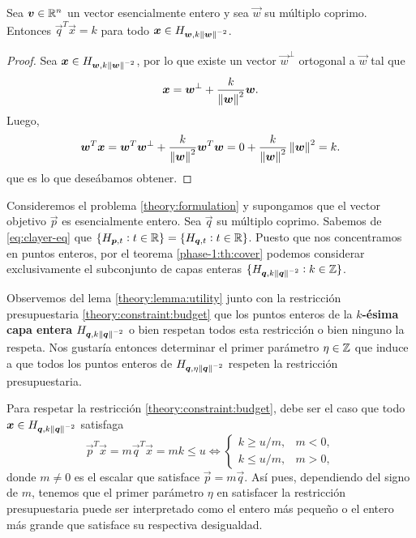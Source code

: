 \begin{lemma}
	\label{theory:lemma:utility}
	Sea $\boldsymbol{v} \in \mathbb{R}^n$ un vector esencialmente entero y sea $\vec{w}$ su múltiplo coprimo.
	Entonces $\vec{q}^T\vec{x} = k$ para todo $\boldsymbol{x} \in H_{\boldsymbol{w}, k\left\lVert \boldsymbol{w} \right\rVert^{-2}}$.
\end{lemma}
\begin{proof}
	Sea $\boldsymbol{x} \in H_{\boldsymbol{w}, k\left\lVert \boldsymbol{w} \right\rVert^{-2}}$, por lo que existe un vector $\vec{w}^\perp$ ortogonal a
	$\vec{w}$ tal que
	\begin{equation*}
		\boldsymbol{x} = \boldsymbol{w}^\perp + \frac{k}{\left\lVert \boldsymbol{w} \right\rVert^2}\boldsymbol{w}.
	\end{equation*}
	Luego,
	\begin{equation*}
		\boldsymbol{w}^T\boldsymbol{x} = \boldsymbol{w}^T\boldsymbol{w}^\perp + \frac{k}{\left\lVert \boldsymbol{w} \right\rVert^2}\boldsymbol{w}^T\boldsymbol{w}
		=
		0 + \frac{k}{\left\lVert \boldsymbol{w} \right\rVert^2}\left\lVert \boldsymbol{w} \right\rVert^2 = k.
	\end{equation*}
	que es lo que deseábamos obtener.
\end{proof}


Consideremos el problema \eqref{theory:formulation} y supongamos que el vector objetivo $\vec{p}$ es
esencialmente entero. Sea $\vec{q}$ su múltiplo coprimo. Sabemos de \eqref{eq:clayer-eq} que 
	$\lbrace H_{\boldsymbol{p}, t} \vcentcolon t \in \mathbb{R} \rbrace
	=
	\lbrace H_{\boldsymbol{q}, t} \vcentcolon t \in \mathbb{R} \rbrace$.
Puesto que nos concentramos en puntos enteros, por el teorema \ref{phase-1:th:cover} podemos
considerar exclusivamente el subconjunto de capas enteras $\lbrace H_{\boldsymbol{q}, k\left\lVert \boldsymbol{q} \right\rVert^{-2}} \vcentcolon k \in
\mathbb{Z} \rbrace$.

Observemos del lema \ref{theory:lemma:utility} junto con la restricción presupuestaria
\eqref{theory:constraint:budget} que los puntos enteros de la \textbf{$k$-ésima capa entera}
$H_{\boldsymbol{q}, k\left\lVert \boldsymbol{q} \right\rVert^{-2}}$ o bien respetan todos esta restricción o bien ninguno la respeta. Nos gustaría
entonces determinar el primer parámetro $\eta \in \mathbb{Z}$ que induce a que todos los puntos enteros de
$H_{\boldsymbol{q}, \eta\left\lVert \boldsymbol{q} \right\rVert^{-2}}$ respeten la restricción presupuestaria.

Para respetar la restricción \eqref{theory:constraint:budget}, debe ser el caso que
todo $\boldsymbol{x} \in H_{\boldsymbol{q}, k\left\lVert \boldsymbol{q} \right\rVert^{-2}}$ satisfaga
\begin{equation}
	\label{eq:eta-cases}
	\vec{p}^T\vec{x} = m\vec{q}^T\vec{x} = mk \leq u
	\iff
	\begin{cases}
		k \geq u/m, & m < 0, \\
		k \leq u/m, & m > 0,
	\end{cases}
\end{equation}
donde $m \neq 0$ es el escalar que satisface $\vec{p} = m\vec{q}$. Así pues, dependiendo del signo
de $m$, tenemos que el primer parámetro $\eta$ en satisfacer la restricción presupuestaria puede ser
interpretado como el entero más pequeño o el entero más grande que satisface su respectiva
desigualdad.

